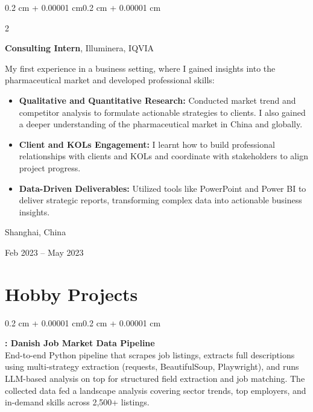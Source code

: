 \documentclass[10pt, letterpaper]{article}
\newenvironment{highlights}{
    \begin{itemize}[
        topsep=0.10 cm,
        parsep=0.10 cm,
        partopsep=0pt,
        itemsep=0pt,
        leftmargin=0.4 cm + 10pt
    ]
}{
    \end{itemize}
}
\newenvironment{onecolentry}{
    \begin{adjustwidth}{0.2 cm + 0.00001 cm}{0.2 cm + 0.00001 cm}
}{
    \end{adjustwidth}
}
\newenvironment{twocolentry}[2][]{
    \onecolentry
    \def\secondColumn{#2}
    \setcolumnwidth{\fill, 4.5 cm}
    \begin{paracol}{2}
}{
    \switchcolumn \raggedleft \secondColumn
    \end{paracol}
    \endonecolentry
}
\let\hrefWithoutArrow\href
\renewcommand{\href}[2]{\hrefWithoutArrow{#1}{\ifthenelse{\equal{#2}{}}{ }{#2 }\raisebox{.15ex}{\footnotesize \faExternalLink*}}}
\begin{document}
        \begin{twocolentry}{
    Shanghai, China

    Feb 2023 -- May 2023
}
    \textbf{Consulting Intern}, Illuminera, IQVIA

    \vspace{0.1cm}

    My first experience in a business setting, where I gained insights into the pharmaceutical market and developed professional skills:

    \begin{highlights}
        \item \textbf{Qualitative and Quantitative Research:} Conducted market trend and competitor analysis to formulate actionable strategies to clients. I also gained a deeper understanding of the pharmaceutical market in China and globally.

        \vspace{0.1cm}

        \item \textbf{Client and KOLs Engagement:} I learnt how to build professional relationships with clients and KOLs and coordinate with stakeholders to align project progress.

        \vspace{0.1cm}

        \item \textbf{Data-Driven Deliverables:} Utilized tools like PowerPoint and Power BI to deliver strategic reports, transforming complex data into actionable business insights.
    \end{highlights}
\end{twocolentry}

        \vspace{0.3 cm}


    \section{Hobby Projects}

\begin{onecolentry}

\textbf{\href{https://github.com/chunxubioinfor/Job_dk}{Job\_dk}: Danish Job Market Data Pipeline} \\
End-to-end Python pipeline that scrapes job listings, extracts full descriptions using multi-strategy extraction (requests, BeautifulSoup, Playwright), and runs LLM-based analysis on top for structured field extraction and job matching. The collected data fed a landscape analysis covering sector trends, top employers, and in-demand skills across 2,500+ listings.

\end{onecolentry}
\end{document}
